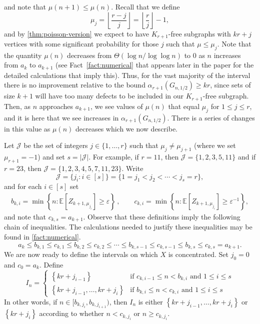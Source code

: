 \documentclass[11pt]{article}
\theoremstyle{definition}
\theoremstyle{remark}
\renewcommand{\epsilon}{\varepsilon}
\newcommand{\EE}{\mathbb{E}}
\newcommand{\cJ}{\mathcal{J}}
\begin{document}
and note that $\mu(n+1) \le \mu(n)$. 
Recall that we define
\[ \mu_j = \left\lfloor \frac{r-j}{j} \right\rfloor = \left\lfloor \frac{r}{j} \right\rfloor-1, \]
and by \cref{thm:poisson-version} we expect to have $K_{r+1}$-free subgraphs with $kr+j$ vertices with some significant probability for those $j$ such that $ \mu \le \mu_j$. Note that the quantity $ \mu(n)$ decreases from $ \Theta( \log n/ \log \log n)$  to $0$ as $n$ increases from $a_k$ to $a_{k+1}$ (see Fact~\ref{fact:numerical} that appears later in the paper for the detailed calculations that imply this). Thus, for the vast majority of the interval there is no improvement relative to the bound $ \alpha_{r+1}( G_{n,1/2}) \ge kr$, since sets of size $k+1$ will have too many defects to be included in our $K_{r+1}$-free subgraph. Then, as $n$ approaches $ a_{k+1}$, we see values of $\mu(n)$ that equal $\mu_j$ for $ 1 \le j\le r$, and it is here that we see increases in $ \alpha_{r+1}( G_{n,1/2})$. There is a series of changes in this value as $ \mu(n) $ decreases which we now describe.


Let $ \cJ $
be the set of integers $ j \in \{1, \dots ,r\} $ such that $ \mu_j \neq \mu_{j+1}$  (where we set $ \mu_{r+1} = -1$) and set $ s = | \cJ|$. For example, if $r=11$, then $\cJ=\{1,2,3,5,11\}$
and if $r=23$, then $\cJ=\{1,2,3,4,5,7,11,23\}$.
Write
$$ \cJ = \{j_i: i \in [s] \} = \{ 1=j_1<j_2<\cdots < j_s = r\},$$
and for each $i \in [s]$ set
\begin{align*}
b_{k,i}  = \min\left\{ n : \EE  [Z_{k+1, \mu_{j_i}}]\ge \epsilon \right\}\,,\qquad 
c_{k,i} = \min\left\{ n : \EE  [Z_{k+1, \mu_{j_i}}] \ge \epsilon^{-1} \right\},
\end{align*}
and note that $c_{k,s} = a_{k+1}$.
Observe that these definitions imply the following chain of inequalities.  The calculations needed to justify these inequalities may be found in \cref{fact:numerical}. 
$$a_k \le b_{k,1} \le c_{k,1} \le b_{k,2} \le c_{k,2} \le \cdots \le b_{k,s-1}\le c_{k, s-1} \le b_{k,s} \le c_{k,s} = a_{k+1}.$$
We are now ready to define the intervals on which $X$ is concentrated. Set $ j_0 = 0$ and  $ c_0 = a_k$.
Define
\[ I_n = \begin{cases}   
    \left\{ kr+ j_{i-1}  \right\}    & \text{if } c_{k,i-1} \le n < b_{k, i} \text{ and } 1 \le i \le s  \\
   \left\{ kr + j_{i-1}, \dots, kr+ j_{i} \right\}  & \text{if } b_{k,i} \le n < c_{k,i}  \text{ and } 1 \le i \le s 
\end{cases}\]
 In other words, if $n \in [b_{k, j_i}, b_{k, j_{i+1}})$, then $I_n$ is either
$\left\{ kr + j_{i-1}, \dots, kr+ j_i \right\}$ or  $\left\{ kr+ j_i  \right\}$ according to whether $n < c_{k,j_i}$ or $n \ge c_{k,j_i}$.  
\end{document}
